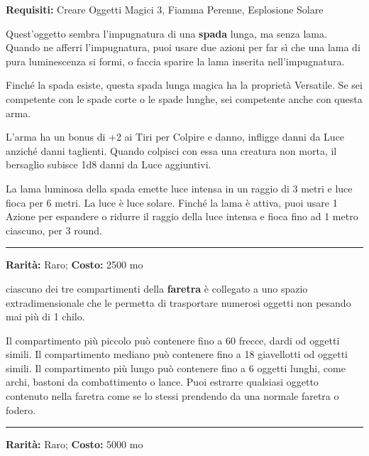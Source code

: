 \begin{multicols}{2}
\textbf{Requisiti:} Creare Oggetti Magici 3, Fiamma Perenne, Esplosione Solare

Quest'oggetto sembra l'impugnatura di una \textbf{spada} lunga, ma senza lama. Quando ne afferri l'impugnatura, puoi usare due azioni per far sì che una lama di pura luminescenza si formi, o faccia sparire la lama inserita nell'impugnatura.

Finché la spada esiste, questa spada lunga magica ha la proprietà Versatile. Se sei competente con le spade corte o le spade lunghe, sei competente anche con questa arma.

L'arma ha un bonus di +2 ai Tiri per Colpire e danno, infligge danni da Luce anziché danni taglienti. Quando colpisci con essa una creatura non morta, il bersaglio subisce 1d8 danni da Luce aggiuntivi.

La lama luminosa della spada emette luce intensa in un raggio di 3 metri e luce fioca per 6 metri. La luce è luce solare. Finché la lama è attiva, puoi usare 1 Azione per espandere o ridurre il raggio della luce intensa e fioca fino ad 1 metro ciascuno, per 3 round.

\smallskip\noindent\rule{\linewidth}{2pt}  \hypertarget{FaretraEfficiente}{}\smallskip{}\noindent\label{FaretraEfficiente}

\textbf{Rarità:} Raro; \textbf{Costo:} 2500 mo

ciascuno dei tre compartimenti della \textbf{faretra} è collegato a uno spazio extradimensionale che le permetta di trasportare numerosi oggetti non pesando mai più di 1 chilo.

Il compartimento più piccolo può contenere fino a 60 frecce, dardi od oggetti simili. Il compartimento mediano può contenere fino a 18 giavellotti od oggetti simili. Il compartimento più lungo può contenere fino a 6 oggetti lunghi, come archi, bastoni da combattimento o lance. Puoi estrarre qualsiasi oggetto contenuto nella faretra come se lo stessi prendendo da una normale faretra o fodero.

\smallskip\noindent\rule{\linewidth}{2pt}  \hypertarget{FascediFerrodelVincolo}{}\smallskip{}\noindent\label{FascediFerrodelVincolo}

\textbf{Rarità:} Raro; \textbf{Costo:} 5000 mo


\end{multicols}
